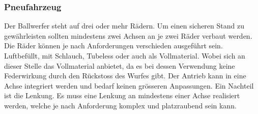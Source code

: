 \subsubsection{Pneufahrzeug}
Der Ballwerfer steht auf drei oder mehr Rädern. Um einen sicheren Stand zu gewährleisten sollten mindestens zwei Achsen an je zwei Räder verbaut werden. Die Räder können je nach Anforderungen verschieden ausgeführt sein. Luftbefüllt, mit Schlauch, Tubeless oder auch als Vollmaterial. Wobei sich an dieser Stelle das Vollmaterial anbietet, da es bei dessen Verwendung keine Federwirkung durch den Rückstoss des Wurfes gibt. Der Antrieb kann in eine Achse integriert werden und bedarf keinen grösseren Anpassungen. Ein Nachteil ist die Lenkung. Es muss eine Lenkung an mindestens einer Achse realisiert werden, welche je nach Anforderung komplex und platzraubend sein kann.
 

